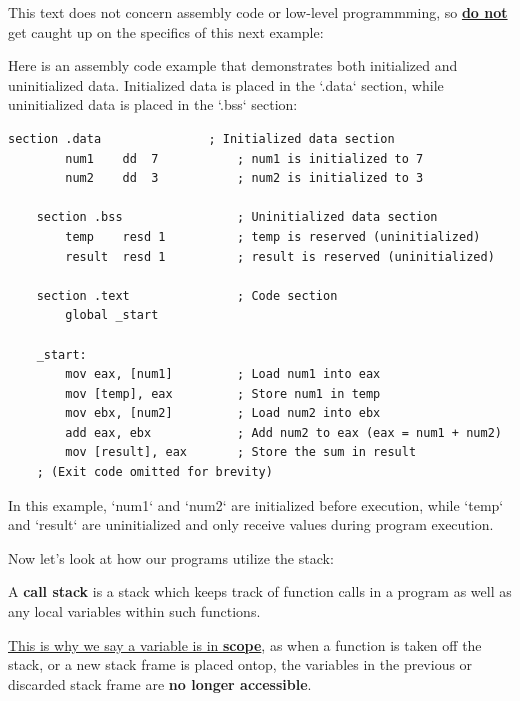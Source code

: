 \newpage

\noindent
This text does not concern assembly code or low-level programmming, so \underline{\textbf{do not}} get caught up on the specifics of this next example:
\begin{Example}

    \label{ex:assembly_code}
    Here is an assembly code example that demonstrates both initialized and uninitialized data. 
    Initialized data is placed in the `.data` section, while uninitialized data is placed in the `.bss` section:

    \begin{lstlisting}[language={[x86masm]Assembler}, numbers=none]
    section .data               ; Initialized data section
        num1    dd  7           ; num1 is initialized to 7
        num2    dd  3           ; num2 is initialized to 3

    section .bss                ; Uninitialized data section
        temp    resd 1          ; temp is reserved (uninitialized)
        result  resd 1          ; result is reserved (uninitialized)

    section .text               ; Code section
        global _start

    _start:
        mov eax, [num1]         ; Load num1 into eax
        mov [temp], eax         ; Store num1 in temp
        mov ebx, [num2]         ; Load num2 into ebx
        add eax, ebx            ; Add num2 to eax (eax = num1 + num2)
        mov [result], eax       ; Store the sum in result
    ; (Exit code omitted for brevity)
    \end{lstlisting}

    \noindent
    In this example, `num1` and `num2` are initialized before execution, while `temp` and `result` are uninitialized and only receive values during program execution.
\end{Example}

\noindent
Now let's look at how our programs utilize the stack:
\begin{Def}

    A \textbf{call stack} is a stack which keeps track of function calls in a program as well as any local variables within such functions.
    
    \underline{This is why we say a variable is in \textbf{scope}}, as when a function is taken off the stack, or a new stack frame 
    is placed ontop, the variables in the previous or discarded stack frame are \textbf{no longer accessible}.
\end{Def}

